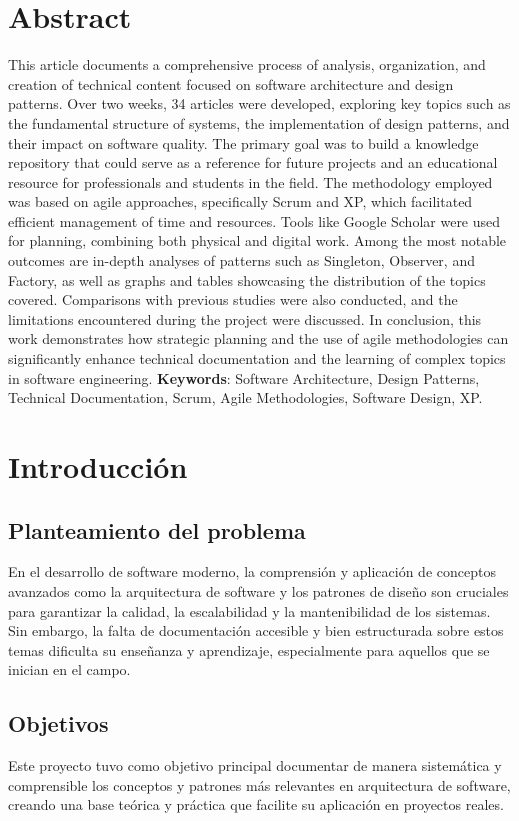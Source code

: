 \documentclass[12pt, a4paper, twocolumn]{article}
\begin{document}
\section{Abstract}
This article documents a comprehensive process of analysis, organization, and creation of technical content focused on software architecture and design patterns. Over two weeks, 34 articles were developed, exploring key topics such as the fundamental structure of systems, the implementation of design patterns, and their impact on software quality. The primary goal was to build a knowledge repository that could serve as a reference for future projects and an educational resource for professionals and students in the field. The methodology employed was based on agile approaches, specifically Scrum and XP, which facilitated efficient management of time and resources. Tools like Google Scholar were used for planning, combining both physical and digital work. Among the most notable outcomes are in-depth analyses of patterns such as Singleton, Observer, and Factory, as well as graphs and tables showcasing the distribution of the topics covered. Comparisons with previous studies were also conducted, and the limitations encountered during the project were discussed. In conclusion, this work demonstrates how strategic planning and the use of agile methodologies can significantly enhance technical documentation and the learning of complex topics in software engineering.
\textbf{Keywords}: Software Architecture, Design Patterns, Technical Documentation, Scrum, Agile Methodologies, Software Design, XP.



\section{Introducción}

\subsection{Planteamiento del problema}
En el desarrollo de software moderno, la comprensión y aplicación de conceptos avanzados como la arquitectura de software y los patrones de diseño son cruciales para garantizar la calidad, la escalabilidad y la mantenibilidad de los sistemas. Sin embargo, la falta de documentación accesible y bien estructurada sobre estos temas dificulta su enseñanza y aprendizaje, especialmente para aquellos que se inician en el campo.

\subsection{Objetivos}
Este proyecto tuvo como objetivo principal documentar de manera sistemática y comprensible los conceptos y patrones más relevantes en arquitectura de software, creando una base teórica y práctica que facilite su aplicación en proyectos reales.
\end{document}
